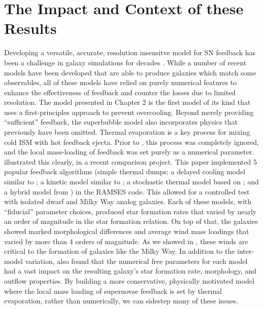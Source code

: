 \section{The Impact and Context of these Results}
Developing a versatile, accurate, resolution insensitve model for SN feedback has
been a challenge in galaxy simulations for decades \citep{Katz1992}.  While a
number of recent models have been developed that are able to produce galaxies
which match some observables, all of these models have relied on purely
numerical features to enhance the effectiveness of feedback and counter the
losses due to limited resolution.  The \citet{Keller2014} model presented in
Chapter 2 is the first model of its kind that uses a first-principles approach
to prevent overcooling.  Beyond merely providing ``sufficient'' feedback, the
superbubble model also incorporates physics that previously have been omitted.
Thermal evaporation is a key process for mixing cold ISM with hot feedback
ejecta.  Prior to \citet{Keller2014}, this process was completely ignored, and
the local mass-loading of feedback was set purely as a numerical parameter.
\citet{Rosdahl2016} illustrated this clearly, in a recent comparison project.
This paper implemented 5 popular feedback algorithms (simple thermal dumps; a
delayed cooling model similar to \citet{Agertz2013}; a kinetic model similar to
\citet{DallaVecchia2008}; a stochastic thermal model based on
\citet{DallaVecchia2012}; and a hybrid model from \citet{Kimm2015}) in the {\sc
RAMSES} code.  This allowed for a controlled test with isolated dwarf and Milky
Way analog galaxies. Each of these models, with ``fiducial'' parameter choices,
produced star formation rates that varied by nearly an order of magnitude in the
\citet{Kennicutt1998} star formation relation.  On top of that, the galaxies
showed marked morphological differences and average wind mass loadings that
varied by more than 4 orders of magnitude.  As we showed in \citet{Keller2015},
these winds are critical to the formation of galaxies like the Milky Way.  In
addition to the inter-model variation, \citet{Rosdahl2016} also found that the
numerical free parameters for each model had a vast impact on the resulting
galaxy's star formation rate, morphology, and outflow properties.  By building a
more conservative, physically motivated model where the local mass loading of
supernovae feedback is set by thermal evaporation, rather than numerically, we
can sidestep many of these issues.

